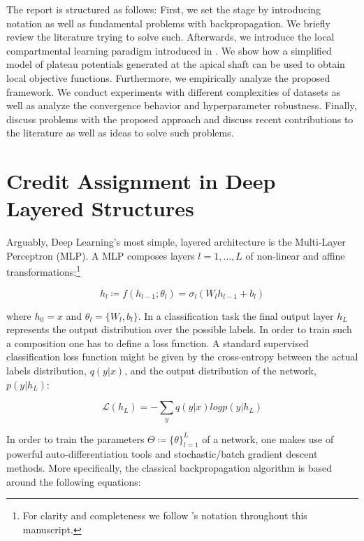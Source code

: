 \documentclass[colorinlistoftodos]{article}
\theoremstyle{definition}
\begin{document}
The report is structured as follows: First, we set the stage by introducing notation as well as fundamental problems with backpropagation. 
We briefly review the literature trying to solve such.
Afterwards, we introduce the local compartmental learning paradigm introduced in \citet{guerguiev2017}. We show how a simplified model of plateau potentials generated at the apical shaft can be used to obtain local objective functions.
Furthermore, we empirically analyze the proposed framework. We conduct experiments with different complexities of datasets as well as analyze the convergence behavior and hyperparameter robustness.
Finally, discuss problems with the proposed approach and discuss recent contributions to the literature as well as ideas to solve such problems.



\newpage
\section{Credit Assignment in Deep Layered Structures}

Arguably, Deep Learning's most simple, layered architecture is the Multi-Layer Perceptron (MLP). A MLP composes layers $l=1, \dots, L$ of non-linear and affine transformations:\footnote{For clarity and completeness we follow \citet{bartunov2018}'s notation throughout this manuscript.}

$$h_l \coloneqq f(h_{l-1}; \theta_l) = \sigma_l (W_l h_{l-1} + b_l)$$ 

where $h_0 = x$ and $\theta_l = \{W_l, b_l\}$. In a classification task the final output layer $h_L$ represents the output distribution over the possible labels. In order to train such a composition one has to define a loss function. A standard supervised classification loss function might be given by the cross-entropy between the actual labels distribution, $q(y|x)$, and the output distribution of the network, $p(y|h_L)$:

$$\mathcal{L}(h_L) = - \sum_y q(y|x) log p(y|h_L)$$

In order to train the parameters $\Theta \coloneqq \{\theta\}_{l=1}^L$ of a network, one makes use of powerful auto-differentiation tools and stochastic/batch gradient descent methods. More specifically, the classical backpropagation algorithm is based around the following equations:
\end{document}
